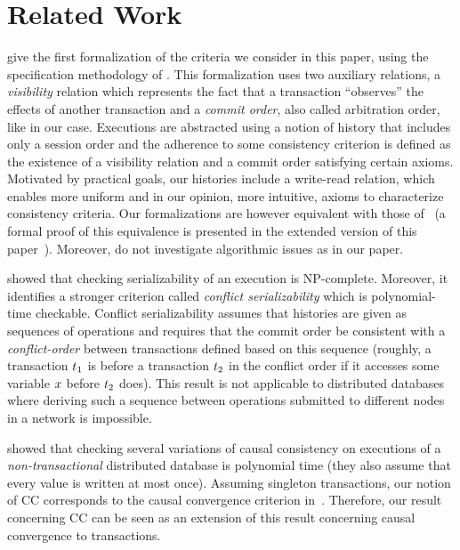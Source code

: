 
\section{Related Work}

\cite{DBLP:conf/concur/Cerone0G15} give the first formalization of the criteria we consider in this paper, using the specification methodology of \cite{DBLP:conf/popl/BurckhardtGYZ14}. This formalization uses two auxiliary relations, a \emph{visibility} relation which represents the fact that a transaction ``observes'' the effects of another transaction and a \emph{commit order}, also called arbitration order, like in our case. Executions are abstracted using a notion of history that includes only a session order and the adherence to some consistency criterion is defined as the existence of a visibility relation and a commit order satisfying certain axioms. Motivated by practical goals, our histories include a write-read relation, which enables more uniform and in our opinion, more intuitive, axioms to characterize consistency criteria. Our formalizations are however equivalent with those of~\cite{DBLP:conf/concur/Cerone0G15} (a formal proof of this equivalence is presented in the extended version of this paper~\cite{DBLP:journals/corr/abs-1908-04509}). Moreover, \cite{DBLP:conf/concur/Cerone0G15} do not investigate algorithmic issues as in our paper.

\cite{DBLP:journals/jacm/Papadimitriou79b} showed that checking serializability of an execution is NP-complete. Moreover, it identifies a stronger criterion called \emph{conflict serializability} which is polynomial-time checkable. Conflict serializability assumes that histories are given as sequences of operations and requires that the commit order be consistent with a \emph{conflict-order} between transactions defined based on this sequence (roughly, a transaction ${t}_1$ is before a transaction ${t}_2$ in the conflict order if it accesses some variable ${x}$ before ${t}_2$ does). This result is not applicable to distributed databases where deriving such a sequence between operations submitted to different nodes in a network is impossible.

\cite{DBLP:conf/popl/BouajjaniEGH17} showed that checking several variations of causal consistency on executions of a \emph{non-transactional} distributed database is polynomial time (they also assume that every value is written at most once). 
Assuming singleton transactions, our notion of CC corresponds to the causal convergence criterion in~\cite{DBLP:conf/popl/BouajjaniEGH17}. Therefore, our result concerning CC can be seen as an extension of this result concerning causal convergence to transactions.

